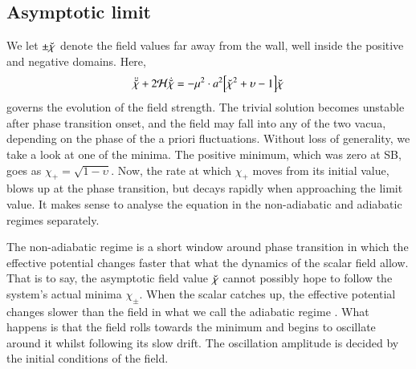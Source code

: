 \subsection{Asymptotic limit}\label{sec:PT:symm_dws:asymptotic}
    We let $\pm\breve{\chi}$ denote the field values far away from the wall, well inside the positive and negative domains. Here,
    \begin{equation}\label{eq:PT:symm_dws:eom_asym_chi_s}
        \ddot{\breve{\chi}} +  2\mathcal{H} \dot{\breve{\chi}} = - \mu^2 \cdot a^2{\left[  \breve{\chi}^2 + \upsilon - 1  \right]}\breve{\chi}
    \end{equation}
    governs the evolution of the field strength. The trivial solution becomes unstable after phase transition onset, and the field may fall into any of the two vacua, depending on the phase of the a priori fluctuations. Without loss of generality, we take a look at one of the minima. The positive minimum, which was zero at SB, goes as $\chi_+ = \sqrt{1-\upsilon}$. Now, the rate at which $\chi_+$ moves from its initial value, blows up at the phase transition, but decays rapidly when approaching the limit value. %
    It makes sense to analyse the equation in the  non-adiabatic and  adiabatic regimes separately.

    The non-adiabatic regime  is a short window around phase transition in which the effective potential changes faster that what the dynamics of the scalar field allow. That is to say, the asymptotic field value $\breve{\chi}$ cannot possibly hope to follow the system's actual minima $\chi_\pm$. When the scalar catches up, the effective potential changes slower than the field in what we call the  adiabatic regime . What happens is that the field rolls towards the minimum and begins to oscillate around it whilst following its slow drift. The oscillation amplitude is decided by the initial conditions of the field.



